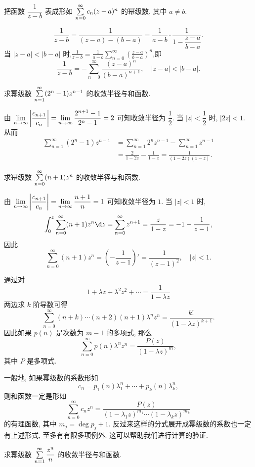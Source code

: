 \begin{example}
	把函数 $\dfrac1{z-b}$ 表成形如 $\sum\limits_{n=0}^\infty c_n(z-a)^n$ 的幂级数, 其中 $a\neq b$.
\end{example}

\begin{solution}
	\[\frac1{z-b}=\frac1{(z-a)-(b-a)}
	{=\frac1{a-b}\cdot\frac1{1-\dfrac{z-a}{b-a}}.}\]
	{当 $|z-a|<|b-a|$ 时,$\displaystyle\frac1{z-b}=\frac1{a-b}\sum_{n=0}^\infty\left(\frac{z-a}{b-a}\right)^n$,即
	\[\frac1{z-b}=-\sum_{n=0}^\infty\frac{(z-a)^n}{(b-a)^{n+1}},\quad|z-a|<|b-a|.\]}
\end{solution}

\begin{example}
	求幂级数 $\sum\limits_{n=1}^\infty(2^n-1)z^{n-1}$ 的收敛半径与和函数.
\end{example}

\begin{solution}
	由 $\displaystyle\lim_{n\to\infty}\left|\frac{c_{n+1}}{c_n}\right|=\lim_{n\to\infty}\frac{2^{n+1}-1}{2^n-1}=2$ 可知收敛半径为 $\dfrac12$.
	{当 $|z|<\dfrac12$ 时, $|2z|<1$.}
	{从而
	\begin{align*}
	\sum_{n=1}^\infty(2^n-1)z^{n-1}&=\sum_{n=1}^\infty 2^n z^{n-1}-\sum_{n=1}^\infty z^{n-1}\\
	&{=\frac2{1-2z}-\frac1{1-z}=\frac1{(1-2z)(1-z)}.}
	\end{align*}}
\end{solution}

\begin{example}
	求幂级数 $\sum\limits_{n=0}^\infty(n+1)z^n$ 的收敛半径与和函数.
\end{example}

\begin{solution}
	由 $\displaystyle\lim_{n\to\infty}\left|\frac{c_{n+1}}{c_n}\right|=\lim_{n\to\infty}\frac{n+1}n=1$ 可知收敛半径为 $1$.
{当 $|z|<1$ 时,
	\[\int_0^z\sum_{n=0}^\infty(n+1)z^n\d z=\sum_{n=0}^\infty z^{n+1}=\frac z{1-z}=-1-\frac1{z-1},\]
}{因此
	\[\sum_{n=0}^\infty(n+1)z^n=\left(-\frac1{z-1}\right)'=\frac1{(z-1)^2},\quad |z|<1.\]}
\end{solution}

通过对
\[1+\lambda z+\lambda^2 z^2+\cdots=\dfrac1{1-\lambda z}\]
两边求 $k$ 阶导数可得
\[\sum_{n=0}^{\infty}(n+k)\cdots(n+2)(n+1)\lambda^n z^n=\frac{k!}{(1-\lambda z)^{k+1}}.\]
因此如果 $p(n)$ 是次数为 $m-1$ 的多项式, 那么
\[\sum_{n=0}^\infty p(n)\lambda^n z^n=\frac{P(z)}{(1-\lambda z)^{m}},\]
其中 $P$ 是多项式.

一般地, 如果幂级数的系数形如
\[c_n=p_1(n)\lambda_1^n+\cdots+p_k(n)\lambda_k^n,\]
则和函数一定是形如
\[\sum_{n=0}^{\infty}c_nz^n
=\frac{P(z)}{(1-\lambda_1z)^{m_1}\cdots(1-\lambda_kz)^{m_k}}\]
的有理函数,	其中 $m_j=\deg p_j+1$.
反过来这样的分式展开成幂级数的系数也一定有上述形式, 至多有有限多项例外.
这可以帮助我们进行计算的验证.
\begin{exercise}
	求幂级数 $\sum\limits_{n=1}^\infty\dfrac{z^n}n$ 的收敛半径与和函数.
\end{exercise}

